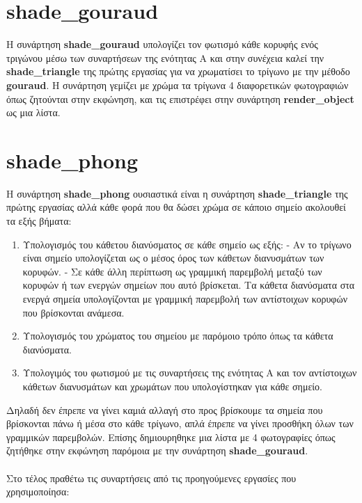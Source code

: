 \documentclass[10pt,a4paper]{article}
\begin{document}
\section*{\textlatin{shade\_gouraud}}
Η συνάρτηση \textbf{\textlatin{shade\_gouraud}} υπολογίζει τον φωτισμό κάθε κορυφής ενός τριγώνου μέσω των συναρτήσεων της ενότητας Α και στην συνέχεια καλεί την \textbf{\textlatin{shade\_triangle}} της πρώτης εργασίας για να χρωματίσει το τρίγωνο με την μέθοδο \textbf{\textlatin{gouraud}}. Η συνάρτηση γεμίζει με χρώμα τα τρίγωνα 4 διαφορετικών φωτογραφιών όπως ζητούνται στην εκφώνηση, και τις επιστρέφει στην συνάρτηση \textbf{\textlatin{render\_object}} ως μια λίστα.

\section*{\textlatin{shade\_phong}}
Η συνάρτηση \textbf{\textlatin{shade\_phong}} ουσιαστικά είναι η συνάρτηση \textbf{\textlatin{shade\_triangle}} της πρώτης εργασίας αλλά κάθε φορά που θα δώσει χρώμα σε κάποιο σημείο ακολουθεί τα εξής βήματα:

\begin{enumerate}
    \item Υπολογισμός του κάθετου διανύσματος σε κάθε σημείο ως εξής:
    \subitem - Αν το τρίγωνο είναι σημείο υπολογίζεται ως ο μέσος όρος των κάθετων διανυσμάτων των κορυφών.
    \subitem - Σε κάθε άλλη περίπτωση ως γραμμική παρεμβολή μεταξύ των κορυφών ή των ενεργών σημείων που αυτό βρίσκεται. Τα κάθετα διανύσματα στα ενεργά σημεία υπολογίζονται με γραμμική παρεμβολή των αντίστοιχων κορυφών που βρίσκονται ανάμεσα.
    \item Υπολογισμός του χρώματος του σημείου με παρόμοιο τρόπο όπως τα κάθετα διανύσματα.
    \item Υπολογιμός του φωτισμού με τις συναρτήσεις της ενότητας Α και τον αντίστοιχων κάθετων διανυσμάτων και χρωμάτων που υπολογίστηκαν για κάθε σημείο.
 \end{enumerate}
 
Δηλαδή δεν έπρεπε να γίνει καμιά αλλαγή στο προς βρίσκουμε τα σημεία που βρίσκονται πάνω ή μέσα στο κάθε τρίγωνο, απλά έπρεπε να γίνει προσθήκη όλων των γραμμικών παρεμβολών.
Επίσης δημιουρηθηκε μια λίστα με 4 φωτογραφίες όπως ζητήθηκε στην εκφώνηση παρόμοια με την συνάρτηση \textbf{\textlatin{shade\_gouraud}}.\\
\\

Στο τέλος πραθέτω τις συναρτήσεις από τις προηγούμενες εργασίες που χρησιμοποίησα:
\end{document}
